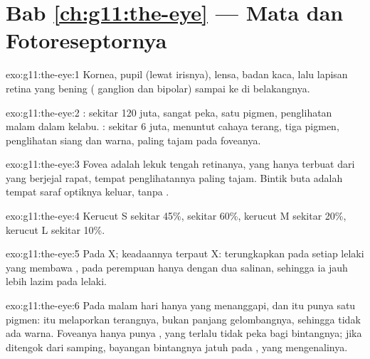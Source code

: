 \section*{Bab \ref{ch:g11:the-eye} --- Mata dan Fotoreseptornya}

\begin{solution}{exo:g11:the-eye:1}
Kornea, pupil (lewat irisnya), lensa, badan kaca, lalu lapisan retina
yang bening ( ganglion dan  bipolar) sampai ke  di
belakangnya.
\end{solution}

\begin{solution}{exo:g11:the-eye:2}
: sekitar 120 juta, sangat peka, satu pigmen, penglihatan
malam dalam kelabu. : sekitar 6 juta, menuntut cahaya
terang, tiga pigmen, penglihatan siang dan warna, paling tajam pada foveanya.
\end{solution}

\begin{solution}{exo:g11:the-eye:3}
Fovea adalah lekuk tengah retinanya, yang hanya terbuat dari  yang berjejal rapat, tempat penglihatannya paling tajam.
Bintik buta adalah tempat saraf optiknya keluar, tanpa .
\end{solution}

\begin{solution}{exo:g11:the-eye:4}
Kerucut S sekitar 45\%,  sekitar 60\%, kerucut M sekitar
20\%, kerucut L sekitar 10\%.
\end{solution}

\begin{solution}{exo:g11:the-eye:5}
Pada  X; keadaannya  terpaut X: terungkapkan pada
setiap lelaki yang membawa , pada perempuan hanya dengan dua
salinan, sehingga ia jauh lebih lazim pada lelaki.
\end{solution}

\begin{solution}{exo:g11:the-eye:6}
Pada malam hari hanya  yang menanggapi, dan  itu punya
satu pigmen:  itu melaporkan terangnya, bukan panjang gelombangnya,
sehingga tidak ada warna. Foveanya hanya punya , yang
terlalu tidak peka bagi bintangnya; jika ditengok dari samping,
bayangan bintangnya jatuh pada , yang mengenalinya.
\end{solution}

